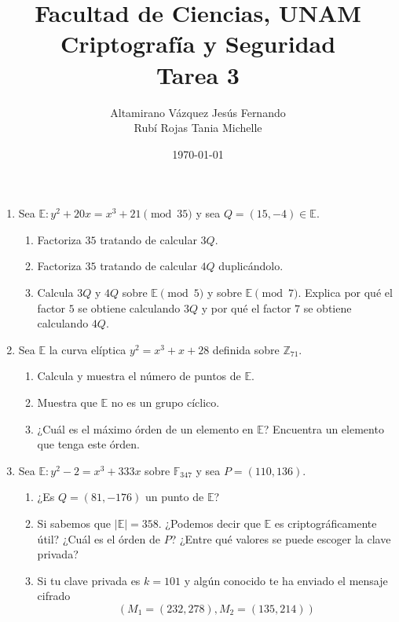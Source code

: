 \documentclass[letterpaper,11pt]{article}
\title{Facultad de Ciencias, UNAM \\ Criptografía y Seguridad \\ Tarea 3}
\author{Altamirano Vázquez Jesús Fernando \\
        Rubí Rojas Tania Michelle}
\date{\today}
\begin{document}
\maketitle

\begin{enumerate}
    \item Sea $\mathbb{E} : y^2 + 20x = x^3 + 21 \pmod{35}$ y sea $Q = (15, -4) 
    \in \mathbb{E}$.
    \begin{enumerate}
        \item Factoriza $35$ tratando de calcular $3Q$.
        \item Factoriza $35$ tratando de calcular $4Q$ duplicándolo.
        \item Calcula $3Q$ y $4Q$ sobre $\mathbb{E} \pmod{5}$ y sobre 
        $\mathbb{E} \pmod{7}$. Explica por qué el factor $5$ se obtiene 
        calculando $3Q$ y por qué el factor $7$ se obtiene calculando $4Q$. 
    \end{enumerate}

    \item Sea $\mathbb{E}$ la curva elíptica $y^2 = x^3 + x + 28$ definida sobre 
    $\mathbb{Z}_{71}$. 
    \begin{enumerate}
        \item Calcula y muestra el número de puntos de $\mathbb{E}$.
        \item Muestra que $\mathbb{E}$ no es un grupo cíclico.
        \item ¿Cuál es el máximo órden de un elemento en $\mathbb{E}$? Encuentra 
        un elemento que tenga este órden. 
    \end{enumerate}

    \item Sea $\mathbb{E} : y^2 - 2 = x^3 + 333x$ sobre $\mathbb{F}_{347}$ y 
    sea $P = (110, 136)$. 
    \begin{enumerate}
        \item ¿Es $Q = (81, -176)$ un punto de $\mathbb{E}$?
        \item Si sabemos que $|\mathbb{E}| = 358$. ¿Podemos decir que 
        $\mathbb{E}$ es criptográficamente útil? ¿Cuál es el órden de $P$? 
        ¿Entre qué valores se puede escoger la clave privada?
        \item Si tu clave privada es $k = 101$ y algún conocido te ha enviado 
        el mensaje cifrado
        \begin{equation*}
            (M_1 = (232, 278), M_2 = (135, 214))
        \end{equation*}


\end{enumerate}
\end{enumerate}
\end{document}
